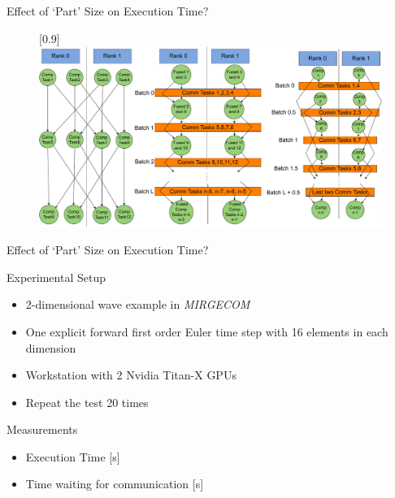 \begin{frame}{Effect of `Part' Size on Execution Time?}

    \begin{figure}[t!]
        \centering
        \scalebox{0.9}[0.9]{\includegraphics[width=\textwidth]{./Figures/koskelo/cross_hatch_combined.pdf}}
    \end{figure}

\end{frame}

\begin{frame}{Effect of `Part' Size on Execution Time?}

    Experimental Setup
    \begin{itemize}
        \item 2-dimensional wave example in \it{MIRGECOM}
        \item One explicit forward first order Euler time step with 16 elements in each dimension
        \item Workstation with 2 Nvidia Titan-X GPUs
        \item Repeat the test 20 times
    \end{itemize}
    
    \medskip
    Measurements
    \begin{itemize}
        \item Execution Time [s]
        \item Time waiting for communication [s]
    \end{itemize}
\end{frame}    

